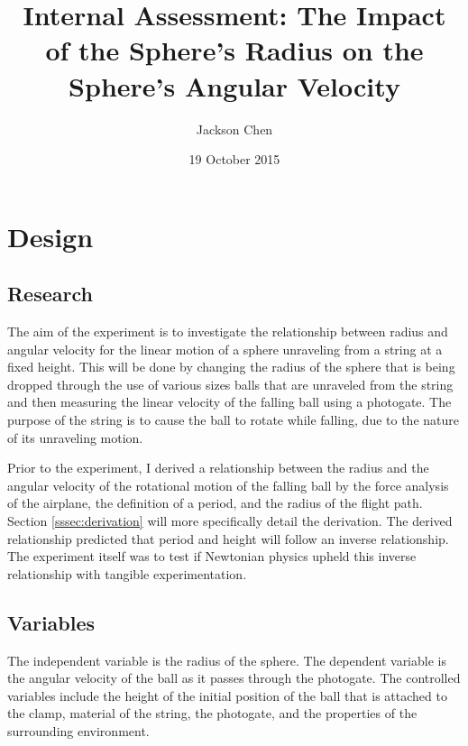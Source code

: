 \documentclass[10pt, letterpaper]{article}
\newcommand{\subtitle}[1]{%
  \posttitle{%
    \par\end{center}
    \begin{center}\large#1\end{center}
    \vskip0.5em}%
}
\begin{document}
  \title{Internal Assessment: The Impact of the Sphere's Radius on the Sphere's Angular Velocity}
  \subtitle {IB Physics II Period 6, Dr. Petach}
  \date{19 October 2015}
  \author{Jackson Chen}
  \maketitle

  \section{Design}

    \subsection{Research}

    The aim of the experiment is to investigate the relationship between radius and
    angular velocity for the linear motion of a sphere unraveling from a string at a
    fixed height. This will be done by changing the radius of the sphere that is being
    dropped through the use of various sizes balls that are unraveled from the string
    and then measuring the linear velocity of the falling ball using a photogate.
    The purpose of the string is to cause the ball to rotate while falling, due to the
    nature of its unraveling motion.

    Prior to the experiment, I derived a relationship between the radius and the angular
    velocity of the rotational motion of the falling ball by the force analysis of the
    airplane, the definition of a period, and the radius of the flight path. Section \ref{sssec:derivation}
    will more specifically detail the derivation. The derived relationship predicted
    that period and height will follow an inverse relationship. The experiment itself
    was to test if Newtonian physics upheld this inverse relationship with tangible experimentation.

    \subsection{Variables}
    The independent variable is the radius of the sphere. The dependent variable is the
    angular velocity of the ball as it passes through the photogate. The controlled variables
    include the height of the initial position of the ball that is attached to the clamp,
    material of the string, the photogate, and the properties of the surrounding environment.
\end{document}
